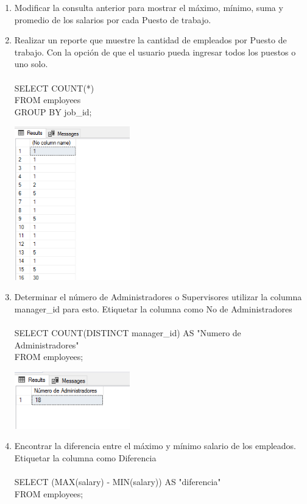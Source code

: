 \begin{enumerate}[1.]
	\item Modificar la consulta anterior para mostrar el máximo, mínimo, suma y promedio de los salarios por cada Puesto de trabajo. 
	\item Realizar un reporte que muestre la cantidad de empleados por Puesto de trabajo. Con la opción de que el usuario pueda ingresar todos los puestos o uno solo.
	\\	
	\\SELECT COUNT(*)	
	\\FROM employees
	\\GROUP BY job\_id;
	\begin{center}
	\includegraphics[width=5cm]{./Imagenes/a7a3} 
	\end{center}
	\item Determinar el n\'umero de Administradores o Supervisores utilizar la columna manager\_id para esto. Etiquetar la columna como No de Administradores
	\\	
	\\SELECT COUNT(DISTINCT manager\_id) AS "Numero de Administradores"
	\\FROM employees;
	\begin{center}
	\includegraphics[width=5cm]{./Imagenes/a7a4} 
	\end{center}
	\item Encontrar la diferencia entre el m\'aximo y m\'inimo salario de los empleados. Etiquetar la columna como Diferencia
	\\
	\\SELECT (MAX(salary) - MIN(salary)) AS "diferencia"
	\\FROM employees;

\end{enumerate}
